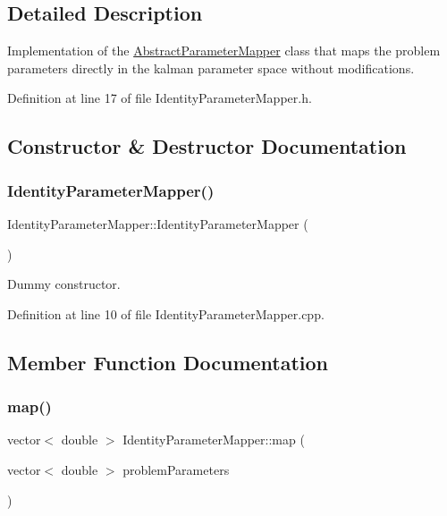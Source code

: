 \subsection{Detailed Description}
Implementation of the \mbox{\hyperlink{classAbstractParameterMapper}{Abstract\+Parameter\+Mapper}} class that maps the problem parameters directly in the kalman parameter space without modifications. 

Definition at line 17 of file Identity\+Parameter\+Mapper.\+h.



\subsection{Constructor \& Destructor Documentation}
\mbox{\label{classIdentityParameterMapper_ae09bce8a0343460df2dc251fede4b8ce}} 
\subsubsection{\texorpdfstring{Identity\+Parameter\+Mapper()}{IdentityParameterMapper()}}
{\footnotesize\ttfamily Identity\+Parameter\+Mapper\+::\+Identity\+Parameter\+Mapper (\begin{DoxyParamCaption}{ }\end{DoxyParamCaption})}

Dummy constructor. 

Definition at line 10 of file Identity\+Parameter\+Mapper.\+cpp.



\subsection{Member Function Documentation}
\mbox{\label{classIdentityParameterMapper_a21105fcfd2e89ac5529f97433f03b1c3}} 
\subsubsection{\texorpdfstring{map()}{map()}}
{\footnotesize\ttfamily vector$<$ double $>$ Identity\+Parameter\+Mapper\+::map (\begin{DoxyParamCaption}\item[{vector$<$ double $>$}]{problem\+Parameters }\end{DoxyParamCaption})\hspace{0.3cm}{\ttfamily [virtual]}}

